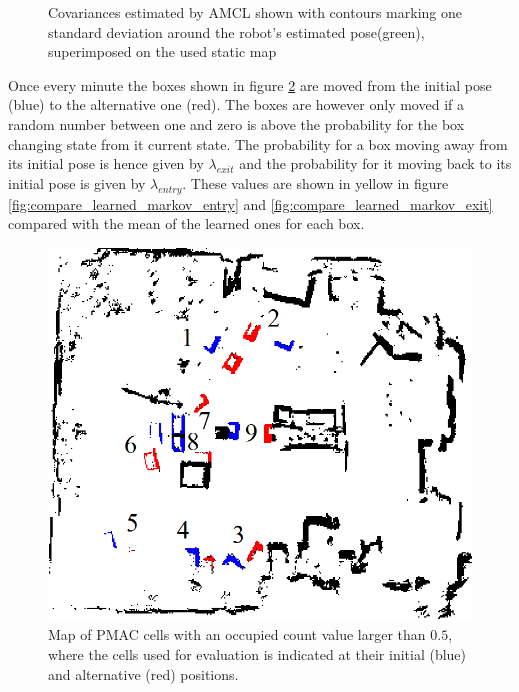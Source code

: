 \begin{figure}[htbp]
    \caption{Covariances estimated by AMCL shown with contours marking one standard deviation around the robot's estimated pose(green), superimposed on the used static map}
    \label{fig:flexlab_path_with_covariance_with_cleaned_map}
\end{figure}

Once every minute the boxes shown in figure \ref{fig:cells_used_for_evaluation_with_identification} are moved from  the initial pose (blue) to the alternative one (red). 
The boxes are however only moved if a random number between one and zero is above the probability for the box changing state from it current state.
The probability for a box moving away from its initial pose is hence given by $\lambda_{exit}$ and the probability for it moving back to its initial pose is given by $\lambda_{entry}$.
These values are shown in yellow in figure \ref{fig:compare_learned_markov_entry} and \ref{fig:compare_learned_markov_exit} compared with the mean of the learned ones for each box.


\begin{figure}
    \centering
    \includegraphics[scale=0.6]{chapters/evaluation/figures/cells_used_for_evaluation_with_identification}
    \caption{Map of PMAC cells with an occupied count value larger than $0.5$, where the cells used for evaluation is indicated at their initial (blue) and alternative (red) positions.}
    \label{fig:cells_used_for_evaluation_with_identification}
\end{figure}

